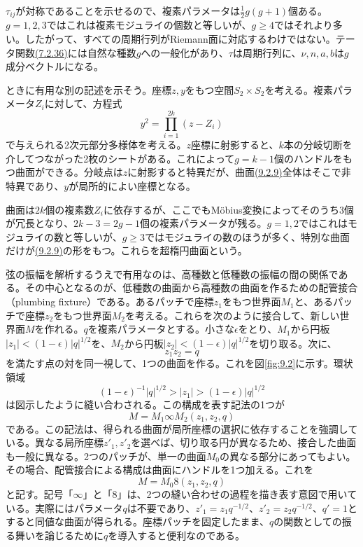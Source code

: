 $\tau_{ij}$が対称であることを示せるので、複素パラメータは$\tfrac12g(g+1)$個ある。$g=1,2,3$ではこれは複素モジュライの個数と等しいが、$g\geq4$ではそれより多い。したがって、すべての周期行列がRiemann面に対応するわけではない。テータ関数\hyperref[eq:7.2.36]{(7.2.36)}には自然な種数$g$への一般化があり、$\tau$は周期行列に、$\nu,n,a,b$は$g$成分ベクトルになる。

ときに有用な別の記述を示そう。座標$z,y$をもつ空間$S_2\times S_2$を考える。複素パラメータ$Z_i$に対して、方程式
\begin{equation}
 y^2=\prod_{i=1}^{2k}(z-Z_i)
 \tag{9.2.9}\label{eq:9.2.9}
\end{equation}
で与えられる2次元部分多様体を考える。$z$座標に射影すると、$k$本の分岐切断を介してつながった2枚のシートがある。これによって$g=k-1$個のハンドルをもつ曲面ができる。分岐点は$z$に射影すると特異だが、曲面\hyperref[eq:9.2.9]{(9.2.9)}全体はそこで非特異であり、$y$が局所的によい座標となる。

曲面は$2k$個の複素数$Z_i$に依存するが、ここでもMöbius変換によってそのうち3個が冗長となり、$2k-3=2g-1$個の複素パラメータが残る。$g=1,2$ではこれはモジュライの数と等しいが、$g\geq3$ではモジュライの数のほうが多く、特別な曲面だけが\hyperref[eq:9.2.9]{(9.2.9)}の形をもつ。これらを超楕円曲面という。

\label{sec:9.3}
弦の振幅を解析するうえで有用なのは、高種数と低種数の振幅の間の関係である。その中心となるのが、低種数の曲面から高種数の曲面を作るための配管接合（plumbing fixture）である。あるパッチで座標$z_1$をもつ世界面$M_1$と、あるパッチで座標$z_2$をもつ世界面$M_2$を考える。これらを次のように接合して、新しい世界面$M$を作れる。$q$を複素パラメータとする。小さな$\epsilon$をとり、$M_1$から円板$|z_1|<(1-\epsilon)|q|^{1/2}$を、$M_2$から円板$|z_2|<(1-\epsilon)|q|^{1/2}$を切り取る。次に、
\begin{equation}
 z_1z_2=q
 \tag{9.3.1}\label{eq:9.3.1}
\end{equation}
を満たす点の対を同一視して、1つの曲面を作る。これを図\ref{fig:9.2}に示す。環状領域
\begin{equation}
 (1-\epsilon)^{-1}|q|^{1/2}>|z_1|>(1-\epsilon)|q|^{1/2}
 \tag{9.3.2}\label{eq:9.3.2}
\end{equation}
は図示したように縫い合わされる。この構成を表す記法の1つが
\begin{equation}
 M=M_1\infty M_2(z_1,z_2,q)
 \tag{9.3.3}\label{eq:9.3.3}
\end{equation}
である。この記法は、得られる曲面が局所座標の選択に依存することを強調している。異なる局所座標$z'_1,z'_2$を選べば、切り取る円が異なるため、接合した曲面も一般に異なる。2つのパッチが、単一の曲面$M_0$の異なる部分にあってもよい。その場合、配管接合による構成は曲面にハンドルを1つ加える。これを
\begin{equation}
 M=M_0 8(z_1,z_2,q)
 \tag{9.3.4}\label{eq:9.3.4}
\end{equation}
と記す。記号「$\infty$」と「$8$」は、2つの縫い合わせの過程を描き表す意図で用いている。実際にはパラメータ$q$は不要であり、$z'_1=z_1q^{-1/2}$、$z'_2=z_2q^{-1/2}$、$q'=1$とすると同値な曲面が得られる。座標パッチを固定したまま、$q$の関数としての振る舞いを論じるために$q$を導入すると便利なのである。

